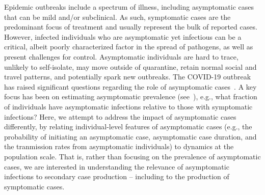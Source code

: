 Epidemic outbreaks include a spectrum of illness, including
asymptomatic cases that can be mild and/or subclinical.
As such, symptomatic cases are the predominant focus of treatment and usually represent
the bulk of reported cases. However, infected individuals who are asymptomatic
yet infectious can be a critical, albeit poorly characterized
factor in the spread of pathogens, as well as 
present challenges for control.
Asymptomatic individuals
are hard to trace, unlikely to self-isolate,
may move outside of quarantine,  
retain normal social and travel patterns, and potentially spark new
outbreaks.
The COVID-19 outbreak has raised significant
questions regarding the role of asymptomatic cases~\citep{fauci_nejm2020}.
A key focus has been on estimating asymptomatic prevalence (see~\citep{mizumoto_2020}), e.g., what fraction of individuals have asymptomatic infections relative to those with symptomatic infections?
Here, we attempt to address the impact of asymptomatic cases differently, by relating 
individual-level features of asymptomatic cases (e.g., the probability
of initiating an asymptomatic case, asymptomatic case duration, and
the tranmission rates from asymptomatic individuals) to dynamics at the
population scale. That is, rather than focusing on the prevalence
of asymptomatic cases, we are interested in understanding the
relevance of asymptomatic infections to secondary case production -- including
to the production of symptomatic cases.

